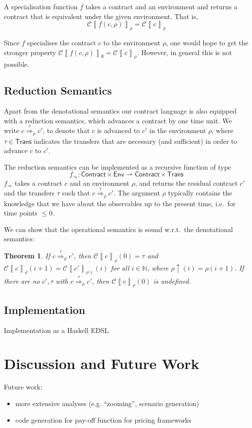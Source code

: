 \documentclass[a4paper,debug,twocolumn]{easychair}
\newcommand\type[1]{\mathsf{#1}}
\newcommand\nats{{\mathbb N}}
\newcommand\pto{\rightharpoonup}
\newcommand\cSem[2]{{\mathcal C}\left\llbracket#1\right\rrbracket_{#2}}
\newcommand\cRed[2]{\stackrel{#2}\Rightarrow_{#1}}
\newcommand\cRedFun{f_{\Rightarrow}}
\newcommand\envAdv[1]{#1\uparrow}
\theoremstyle{plain}
\newtheorem{theorem}{Theorem}
\begin{document}
A specialisation function $f$ takes a contract and an environment and
returns a contract that is equivalent under the given
environment. That is,
\[
\cSem{f(c,\rho)}\rho = \cSem c \rho
\]

Since $f$ specialises the contract $c$ to the environment $\rho$, one
would hope to get the stronger property $\cSem{f(c,\rho)}\emptyset =
\cSem c \rho$. However, in general this is not possible.

\subsection{Reduction Semantics}
\label{sec:reduction-semantics}


Apart from the denotational semantics our contract language is also
equipped with a reduction semantics, which advances a contract by one
time unit. We write $c \cRed \rho \tau c'$, to denote that $c$ is
advanced to $c'$ in the environment $\rho$, where $\tau \in
\type{Trans}$ indicates the transfers that are necessary (and
sufficient) in order to advance $c$ to $c'$.

The reduction semantics can be implemented as a recursive function of
type 
\[
\cRedFun \colon\type{Contract}\times \type{Env} \pto \type{Contract} \times \type{Trans}
\]
$\cRedFun$ takes a contract $c$ and an environment $\rho$, and returns
the residual contract $c'$ and the transfers $\tau$ such that $c
\cRed\rho\tau c'$. The argument $\rho$ typically contains the
knowledge that we have about the observables up to the present time,
i.e.\ for time points $\leq 0$.

We can show that the operational semantics is sound w.r.t.\ the
denotational semantics:
\begin{theorem}
  If $c \cRed\rho\tau c'$, then $\cSem c {\rho} (0) = \tau$ and $\cSem
  c {\rho} (i+1) = \cSem{c'}{\envAdv{\rho}}(i)$ for all $i \in \nats$,
  where $\envAdv{\rho} (i) = \rho(i+1)$. If there are no $c', \tau$
  with $c \cRed\rho\tau c'$, then $\cSem c \rho (0)$ is undefined.
\end{theorem}



\subsection{Implementation}
\label{sec:implementation}

Implementation as a Haskell EDSL

\section{Discussion and Future Work}
\label{sec:disc-future-work}

Future work:
\begin{itemize}
\item more extensive analyses (e.g. ``zooming'', scenario generation)
\item code generation for pay-off function for pricing frameworks
\end{itemize}







\end{document}
